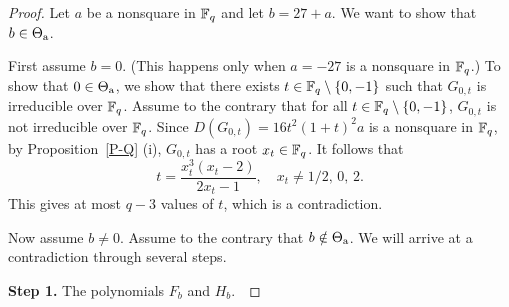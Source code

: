 \documentclass{amsart}
\numberwithin{equation}{section}
\theoremstyle{definition}
\newcommand{\f}{\Bbb F}
\begin{document}
\begin{proof}
Let $a$ be a nonsquare in $\f_q$ and let $b=27+a$. We want to show that $b\in\Theta_{\rm a}$.

First assume $b=0$. (This happens only when $a=-27$ is a nonsquare in $\f_q$.) To show that $0\in\Theta_{\rm a}$, we show that there exists $t\in\f_q\setminus\{0,-1\}$ such that $G_{0,t}$ is irreducible over $\f_q$. Assume to the contrary that for all $t\in\f_q\setminus\{0,-1\}$, $G_{0,t}$ is not irreducible over $\f_q$. Since $D(G_{0,t})=16t^2(1+t)^2a$ is a nonsquare in $\f_q$, by Proposition~\ref{P-Q} (i), $G_{0,t}$ has a root $x_t\in\f_q$. It follows that
\[
t=\frac{x_t^3(x_t-2)}{2x_t-1},\quad x_t\ne 1/2,\, 0,\, 2.
\]
This gives at most $q-3$ values of $t$, which is a contradiction.

Now assume $b\ne 0$. Assume to the contrary that $b\notin\Theta_{\rm a}$. We will arrive at a contradiction through several steps.

\medskip

{\bf Step 1.} The polynomials $F_b$ and $H_b$.\


\end{proof}
\end{document}
